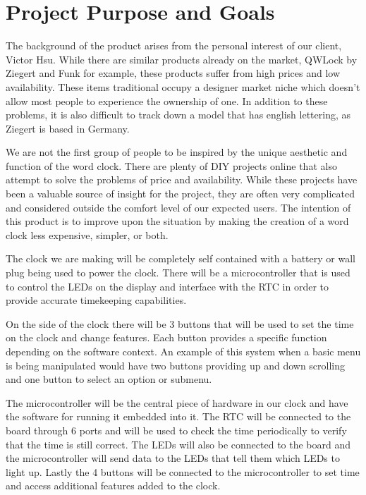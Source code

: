 \documentclass[onecolumn, draftclsnofoot,10pt, compsoc]{IEEEtran}
\begin{document}
\section{Project Purpose and Goals}
The background of the product arises from the personal interest of our client, Victor Hsu.
While there are similar products already on the market, QWLock by Ziegert and Funk for example, these products suffer from high prices and low availability.
These items traditional occupy a designer market niche which doesn't allow most people to experience the ownership of one.
In addition to these problems, it is also difficult to track down a model that has english lettering, as Ziegert is based in Germany.

We are not the first group of people to be inspired by the unique aesthetic and function of the word clock.
There are plenty of DIY projects online that also attempt to solve the problems of price and availability.
While these projects have been a valuable source of insight for the project, they are often very complicated and considered outside the comfort level of our expected users.
The intention of this product is to improve upon the situation by making the creation of a word clock less expensive, simpler, or both.

The clock we are making will be completely self contained with a battery or wall plug being used to power the clock.
There will be a microcontroller that is used to control the LEDs on the display and interface with the RTC in order to provide accurate timekeeping capabilities.

On the side of the clock there will be 3 buttons that will be used to set the time on the clock and change features.
Each button provides a specific function depending on the software context.
An example of this system when a basic menu is being manipulated would have two buttons providing up and down scrolling and one button to select an option or submenu.

The microcontroller will be the central piece of hardware in our clock and have the software for running it embedded into it.
The RTC will be connected to the board through 6 ports and will be used to check the time periodically to verify that the time is still correct.
The LEDs will also be connected to the board and the microcontroller will send data to the LEDs that tell them which LEDs to light up.
Lastly the 4 buttons will be connected to the microcontroller to set time and access additional features added to the clock.
\end{document}
